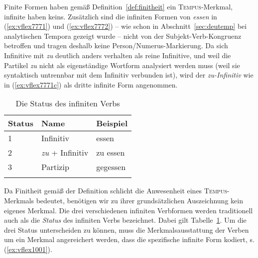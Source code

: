 \begin{exe}
  \ex\label{ex:vflex7771}
  \begin{xlist}
  \end{xlist}
  \ex\label{ex:vflex7772}
  \begin{xlist}
  \end{xlist}
\end{exe}

Finite Formen haben gemäß Definition~\ref{def:finitheit} ein \textsc{Tempus}-Merkmal, infinite haben keins.
Zusätzlich sind die infiniten Formen von \textit{essen} in (\ref{ex:vflex7771}) und (\ref{ex:vflex7772}) -- wie schon in Abschnitt~\ref{sec:deutemp} bei analytischen Tempora gezeigt wurde -- nicht von der Subjekt-Verb-Kongruenz betroffen und tragen deshalb keine Person\slash Numerus-Markierung.
Da sich Infinitive mit \textit{zu} deutlich anders verhalten als reine Infinitive, und weil die Partikel \textit{zu} nicht als eigenständige Wortform analysiert werden muss (weil sie syntaktisch untrennbar mit dem Infinitiv verbunden ist), wird der \textit{zu-Infinitiv} wie in (\ref{ex:vflex7771c}) als dritte infinite Form angenommen.

\begin{table}
  \centering
  \begin{tabular}{lll}
    \lsptoprule
    \textbf{Status} & \textbf{Name} & \textbf{Beispiel} \\
    \midrule
    1 & Infinitiv & essen \\
    2 & \textit{zu} + Infinitiv & zu essen \\
    3 & Partizip & gegessen \\
    \lspbottomrule
  \end{tabular}
  \caption{Die Status des infiniten Verbs}
  \label{tab:status}
\end{table}

Da Finitheit gemäß der Definition schlicht die Anwesenheit eines \textsc{Tempus}-\-Merk\-mals bedeutet, benötigen wir zu ihrer grundsätzlichen Auszeichnung kein eigenes Merkmal.
Die drei verschiedenen infiniten Verbformen werden traditionell auch als die \textit{Status} des infiniten Verbs bezeichnet.
Dabei gilt Tabelle~\ref{tab:status}.
Um die drei Status unterscheiden zu können, muss die Merkmalsausstattung der Verben um ein Merkmal angereichert werden, dass die spezifische infinite Form kodiert, s. (\ref{ex:vflex1001}).

